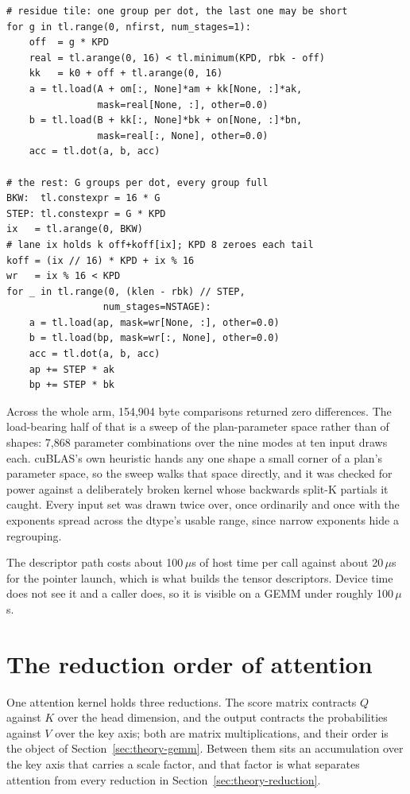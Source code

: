 \documentclass[sigplan,nonacm]{acmart}
\begin{document}
\begin{lstlisting}[style=python]
# residue tile: one group per dot, the last one may be short
for g in tl.range(0, nfirst, num_stages=1):
    off  = g * KPD
    real = tl.arange(0, 16) < tl.minimum(KPD, rbk - off)
    kk   = k0 + off + tl.arange(0, 16)
    a = tl.load(A + om[:, None]*am + kk[None, :]*ak,
                mask=real[None, :], other=0.0)
    b = tl.load(B + kk[:, None]*bk + on[None, :]*bn,
                mask=real[:, None], other=0.0)
    acc = tl.dot(a, b, acc)

# the rest: G groups per dot, every group full
BKW:  tl.constexpr = 16 * G
STEP: tl.constexpr = G * KPD
ix   = tl.arange(0, BKW)
# lane ix holds k off+koff[ix]; KPD 8 zeroes each tail
koff = (ix // 16) * KPD + ix % 16
wr   = ix % 16 < KPD
for _ in tl.range(0, (klen - rbk) // STEP,
                 num_stages=NSTAGE):
    a = tl.load(ap, mask=wr[None, :], other=0.0)
    b = tl.load(bp, mask=wr[:, None], other=0.0)
    acc = tl.dot(a, b, acc)
    ap += STEP * ak
    bp += STEP * bk
\end{lstlisting}

Across the whole arm, 154,904 byte comparisons returned zero differences. The
load-bearing half of that is a sweep of the plan-parameter space rather than of
shapes: 7,868 parameter combinations over the nine modes at ten input draws
each. cuBLAS's own heuristic hands any one shape a small corner of a plan's
parameter space, so the sweep walks that space directly, and it was checked for
power against a deliberately broken kernel whose backwards split-K partials it
caught. Every input set was drawn twice over, once ordinarily and once
with the exponents spread across the dtype's usable range, since narrow
exponents hide a regrouping.

The descriptor path costs about 100\,$\mu$s of host time per call against about
20\,$\mu$s for the pointer launch, which is what builds the tensor descriptors.
Device time does not see it and a caller does, so it is visible on a GEMM
under roughly 100\,$\mu$s.



\section{The reduction order of attention}
\label{app:attention}

One attention kernel holds three reductions. The score matrix contracts $Q$
against $K$ over the head dimension, and the output contracts the probabilities
against $V$ over the key axis; both are matrix multiplications, and their order
is the object of Section~\ref{sec:theory-gemm}. Between them sits an
accumulation over the key axis that carries a scale factor, and that factor is
what separates attention from every reduction in
Section~\ref{sec:theory-reduction}.
\end{document}
